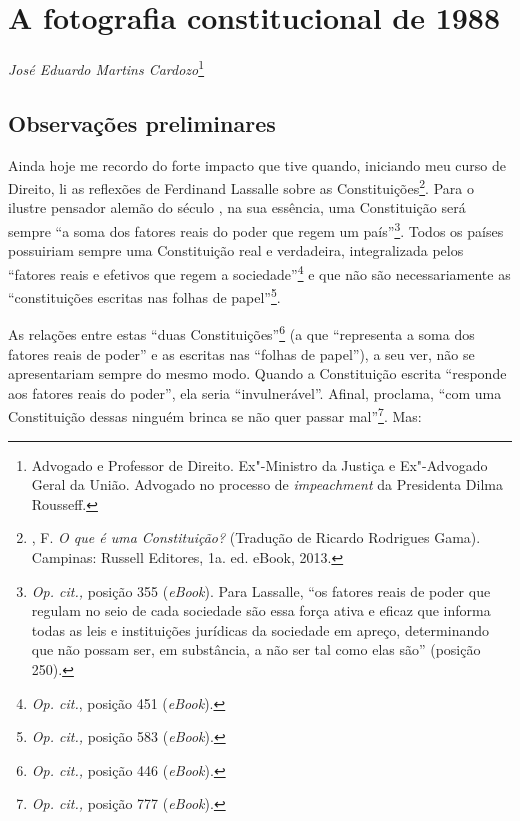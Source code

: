 \chapter*{A fotografia constitucional de 1988}


\begin{flushright}
\emph{José Eduardo Martins Cardozo}\footnote{Advogado e
Professor de Direito. Ex"-Ministro da Justiça e Ex"-Advogado
Geral da União. Advogado no processo de \emph{impeachment} da Presidenta
Dilma Rousseff.}
\end{flushright}

\section{Observações preliminares}

Ainda hoje me recordo do forte impacto que tive quando, iniciando meu
curso de Direito, li as reflexões de Ferdinand Lassalle sobre as
Constituições\footnote{, F. \emph{O que é uma Constituição?} (Tradução de
  Ricardo Rodrigues Gama). Campinas: Russell Editores, 1a. ed. eBook,
  2013.}. Para o ilustre pensador alemão do século , na sua essência,
uma Constituição será sempre ``a soma dos fatores reais do poder
que regem um país''\footnote{\emph{Op. cit.,} posição 355
  (\emph{eBook}). Para Lassalle, ``os fatores reais de poder que
  regulam no seio de cada sociedade são essa força ativa e eficaz que
  informa todas as leis e instituições jurídicas da sociedade em apreço,
  determinando que não possam ser, em substância, a não ser tal como
  elas são'' (posição 250).}. Todos os países possuiriam sempre uma
Constituição real e verdadeira, integralizada pelos ``fatores
reais e efetivos que regem a sociedade''\footnote{\emph{Op. cit.},
  posição 451 (\emph{eBook}).} e que não são necessariamente as
``constituições escritas nas folhas de papel''\footnote{\emph{Op.
  cit.,} posição 583 (\emph{eBook}).}.

As relações entre estas ``duas Constituições''\footnote{\emph{Op.
  cit.,} posição 446 (\emph{eBook}).} (a que ``representa a soma
dos fatores reais de poder'' e as escritas nas ``folhas de
papel''), a seu ver, não se apresentariam sempre do mesmo modo. Quando
a Constituição escrita ``responde aos fatores reais do poder'',
ela seria ``invulnerável''. Afinal, proclama, ``com uma
Constituição dessas ninguém brinca se não quer passar mal''\footnote{\emph{Op.
  cit.,} posição 777 (\emph{eBook}).}. Mas:


